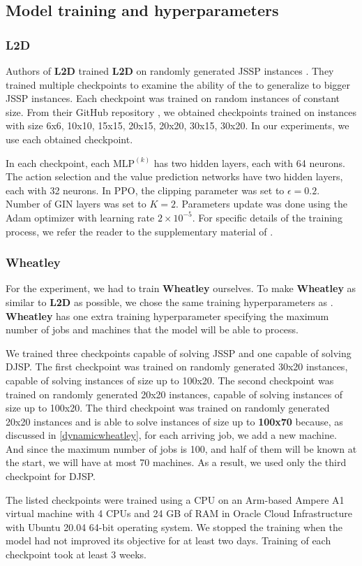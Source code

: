 \subsection{Model training and hyperparameters}
\subsubsection{L2D}
Authors of \textbf{L2D} trained \textbf{L2D} on randomly generated JSSP instances \cite{zhang2020learning}. They trained multiple checkpoints to examine the ability of the  to generalize to bigger JSSP instances. Each checkpoint was trained on random instances of constant size. From their GitHub repository \cite{github_l2d}, we obtained checkpoints trained on instances with size 6x6, 10x10, 15x15, 20x15, 20x20, 30x15, 30x20. In our experiments, we use each obtained checkpoint.
\par
In each checkpoint, each $\text{MLP}^{(k)}$ has two hidden layers, each with 64 neurons. The action selection and the value prediction networks have two hidden layers, each with 32 neurons. In PPO, the clipping parameter was set to $\epsilon = 0.2$. Number of GIN layers was set to $K = 2$. Parameters update was done using the Adam optimizer with learning rate $2\times10^{-5}$. For specific details of the training process, we refer the reader to the supplementary material of \cite{zhang2020learning}.

\subsubsection{Wheatley}
For the experiment, we had to train \textbf{Wheatley} ourselves. To make \textbf{Wheatley} as similar to \textbf{L2D} as possible, we chose the same training hyperparameters as . \textbf{Wheatley} has one extra training hyperparameter specifying the maximum number of jobs and machines that the model will be able to process. 
\par
We trained three checkpoints capable of solving JSSP and one capable of solving DJSP. The first checkpoint was trained on randomly generated 30x20 instances, capable of solving instances of size up to 100x20. The second checkpoint was trained on randomly generated 20x20 instances, capable of solving instances of size up to 100x20. The third checkpoint was trained on randomly generated 20x20 instances and is able to solve instances of size up to \textbf{100x70} because, as discussed in \ref{dynamicwheatley}, for each arriving job, we add a new machine. And since the maximum number of jobs is 100, and half of them will be known at the start, we will have at most 70 machines. As a result, we used only the third checkpoint for DJSP.
\par
The listed checkpoints were trained using a CPU on an Arm-based Ampere A1 virtual machine with 4 CPUs and 24 GB of RAM in Oracle Cloud Infrastructure with Ubuntu 20.04 64-bit operating system. We stopped the training when the model had not improved its objective for at least two days. Training of each checkpoint took at least 3 weeks.

